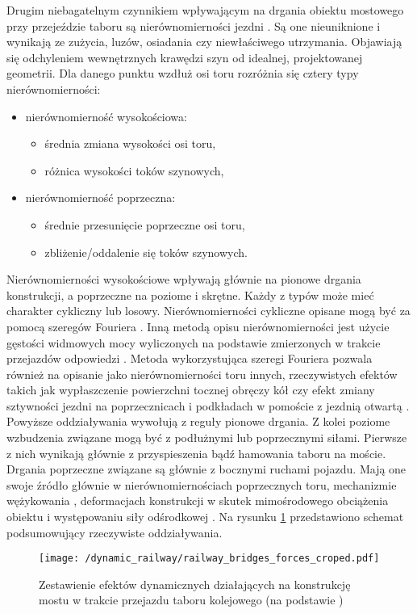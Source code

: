 Drugim niebagatelnym czynnikiem wpływającym na drgania obiektu mostowego przy przejeździe taboru są nierównomierności jezdni \parencite{Ladislav1996,Dias2008}. Są one nieuniknione i wynikają ze zużycia, luzów, osiadania czy niewłaściwego utrzymania. Objawiają się odchyleniem wewnętrznych krawędzi szyn od idealnej, projektowanej geometrii. Dla danego punktu wzdłuż osi toru rozróżnia się cztery typy nierównomierności:
\begin{itemize}[noitemsep]
	\item nierównomierność wysokościowa:
	\begin{itemize}
		\item średnia zmiana wysokości osi toru,
		\item różnica wysokości toków szynowych,
	\end{itemize}
	\item nierównomierność poprzeczna:
	\begin{itemize}
		\item średnie przesunięcie poprzeczne osi toru,
		\item zbliżenie/oddalenie się toków szynowych.
	\end{itemize}
\end{itemize}
Nierównomierności wysokościowe wpływają głównie na pionowe drgania konstrukcji, a poprzeczne na poziome i skrętne. Każdy z typów może mieć charakter cykliczny lub losowy. Nierównomierności cykliczne opisane mogą być za pomocą szeregów Fouriera \parencite{Ladislav1996}. Inną metodą opisu nierównomierności jest użycie gęstości widmowych mocy wyliczonych na podstawie zmierzonych w trakcie przejazdów odpowiedzi \parencite{Claus1998,Dias2008}. Metoda wykorzystująca szeregi Fouriera pozwala również na opisanie jako nierównomierności toru innych, rzeczywistych efektów takich jak wypłaszczenie powierzchni tocznej obręczy kół \parencite{Zhou2020} czy efekt zmiany sztywności jezdni na poprzecznicach i podkładach w pomoście z jezdnią otwartą \parencite{Fryba1999}. Powyższe oddziaływania wywołują z reguły pionowe drgania. Z kolei poziome wzbudzenia związane mogą być z podłużnymi lub poprzecznymi siłami. Pierwsze z nich wynikają głównie z przyspieszenia bądź hamowania taboru na moście. Drgania poprzeczne związane są głównie z bocznymi ruchami pojazdu. Mają one swoje źródło głównie w nierównomiernościach poprzecznych toru, mechanizmie wężykowania \parencite{Babe2016}, deformacjach konstrukcji w skutek mimośrodowego obciążenia obiektu i występowaniu siły odśrodkowej \parencite{Dias2008}. Na rysunku \ref{fig:railway_dynamic_forces} przedstawiono schemat podsumowujący rzeczywiste oddziaływania.
\begin{figure}[h]
	\centering
	\texttt{[image: /dynamic\_railway/railway\_bridges\_forces\_croped.pdf]} 
	\captionsetup{justification=centering}
	\caption{Zestawienie efektów dynamicznych działających na konstrukcję mostu w trakcie przejazdu taboru kolejowego (na podstawie \parencite{Ladislav1996})}
	\label{fig:railway_dynamic_forces}
\end{figure}


